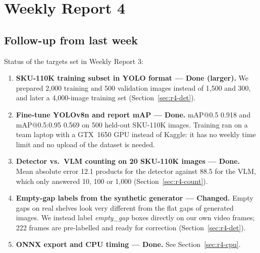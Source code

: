 
\section{Weekly Report 4}

\subsection{Follow-up from last week}
Status of the targets set in Weekly Report 3:
\begin{enumerate}
  \item \textbf{SKU-110K training subset in YOLO format --- Done (larger).} We prepared 2{,}000
  training and 500 validation images instead of 1{,}500 and 300, and later a 4{,}000-image training
  set (Section~\ref{sec:r4-det}).
  \item \textbf{Fine-tune YOLOv8n and report mAP --- Done.} mAP@0.5 0.918 and
  mAP@0.5:0.95 0.569 on 500 held-out SKU-110K images. Training ran on a team laptop with a
  GTX~1650 GPU instead of Kaggle: it has no weekly time limit and no upload of the dataset is needed.
  \item \textbf{Detector vs.\ VLM counting on 20 SKU-110K images --- Done.} Mean absolute error
  12.1 products for the detector against 88.5 for the VLM, which only answered 10, 100 or 1{,}000
  (Section~\ref{sec:r4-count}).
  \item \textbf{Empty-gap labels from the synthetic generator --- Changed.} Empty gaps on real
  shelves look very different from the flat gaps of generated images. We instead label
  \emph{empty\_gap} boxes directly on our own video frames; 222 frames are pre-labelled and ready for
  correction (Section~\ref{sec:r4-det}).
  \item \textbf{ONNX export and CPU timing --- Done.} See Section~\ref{sec:r4-cpu}.
\end{enumerate}

